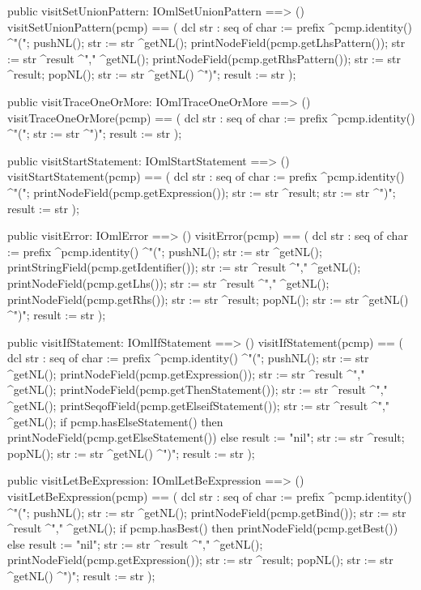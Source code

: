 \begin{vdm_al}
  public visitSetUnionPattern: IOmlSetUnionPattern ==> ()
  visitSetUnionPattern(pcmp) ==
    ( dcl str : seq of char := prefix ^pcmp.identity() ^"(";
      pushNL();
      str := str ^getNL();
      printNodeField(pcmp.getLhsPattern());
      str := str ^result ^"," ^getNL();
      printNodeField(pcmp.getRhsPattern());
      str := str ^result;
      popNL();
      str := str ^getNL() ^")";
      result := str );

  public visitTraceOneOrMore: IOmlTraceOneOrMore ==> ()
  visitTraceOneOrMore(pcmp) ==
    ( dcl str : seq of char := prefix ^pcmp.identity() ^"(";
      str := str ^")";
      result := str );

  public visitStartStatement: IOmlStartStatement ==> ()
  visitStartStatement(pcmp) ==
    ( dcl str : seq of char := prefix ^pcmp.identity() ^"(";
      printNodeField(pcmp.getExpression());
      str := str ^result;
      str := str ^")";
      result := str );

  public visitError: IOmlError ==> ()
  visitError(pcmp) ==
    ( dcl str : seq of char := prefix ^pcmp.identity() ^"(";
      pushNL();
      str := str ^getNL();
      printStringField(pcmp.getIdentifier());
      str := str ^result ^"," ^getNL();
      printNodeField(pcmp.getLhs());
      str := str ^result ^"," ^getNL();
      printNodeField(pcmp.getRhs());
      str := str ^result;
      popNL();
      str := str ^getNL() ^")";
      result := str );

  public visitIfStatement: IOmlIfStatement ==> ()
  visitIfStatement(pcmp) ==
    ( dcl str : seq of char := prefix ^pcmp.identity() ^"(";
      pushNL();
      str := str ^getNL();
      printNodeField(pcmp.getExpression());
      str := str ^result ^"," ^getNL();
      printNodeField(pcmp.getThenStatement());
      str := str ^result ^"," ^getNL();
      printSeqofField(pcmp.getElseifStatement());
      str := str ^result ^"," ^getNL();
      if pcmp.hasElseStatement()
      then printNodeField(pcmp.getElseStatement())
      else result := "nil";
      str := str ^result;
      popNL();
      str := str ^getNL() ^")";
      result := str );

  public visitLetBeExpression: IOmlLetBeExpression ==> ()
  visitLetBeExpression(pcmp) ==
    ( dcl str : seq of char := prefix ^pcmp.identity() ^"(";
      pushNL();
      str := str ^getNL();
      printNodeField(pcmp.getBind());
      str := str ^result ^"," ^getNL();
      if pcmp.hasBest()
      then printNodeField(pcmp.getBest())
      else result := "nil";
      str := str ^result ^"," ^getNL();
      printNodeField(pcmp.getExpression());
      str := str ^result;
      popNL();
      str := str ^getNL() ^")";
      result := str );


\end{vdm_al}
